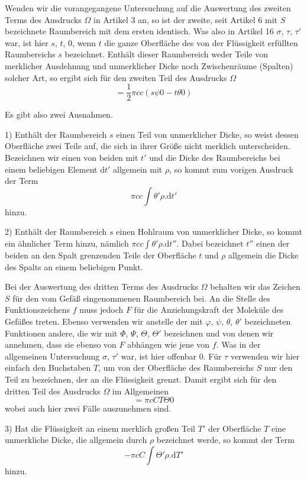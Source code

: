Wenden wir die vorangegangene Untersuchung auf die Auswertung des zweiten Terms des Ausdrucks $\Omega$ in Artikel 3 an, so ist der zweite, seit Artikel 6 mit $S$ bezeichnete Raumbereich mit dem ersten identisch. Was also in Artikel 16 $\sigma$, $\tau$, $\tau'$ war, ist hier $s$, $t$, $0$, wenn $t$ die ganze Oberfläche des von der Flüssigkeit erfüllten Raumbereichs $s$ bezeichnet. Enthält dieser Raumbereich weder Teile von merklicher Ausdehnung und unmerklicher Dicke noch Zwischenräume (Spalten) solcher Art, so ergibt sich für den zweiten Teil des Ausdrucks $\Omega$
\[
=\frac12\pi cc(s\psi0-t\theta0)
\]

Es gibt also zwei Ausnahmen.

1) Enthält der Raumbereich $s$ einen Teil von unmerklicher Dicke, so weist dessen Oberfläche zwei Teile auf, die sich in ihrer Größe nicht merklich unterscheiden. Bezeichnen wir einen von beiden mit $t'$ und die Dicke des Raumbereichs bei einem beliebigen Element $\mathrm{d}t'$ allgemein mit $\rho$, so kommt zum vorigen Ausdruck der Term
\[
\pi cc\int\theta'\rho.\mathrm{d}t'
\]
hinzu.

2) Enthält der Raumbereich $s$ einen Hohlraum von unmerklicher Dicke, so kommt ein ähnlicher Term hinzu, nämlich $\pi cc\int\theta'\rho.\mathrm{d}t''$. Dabei bezeichnet $t''$ einen der beiden an den Spalt grenzenden Teile der Oberfläche $t$ und $\rho$ allgemein die Dicke des Spalts an einem beliebigen Punkt.

Bei der Auswertung des dritten Terms des Ausdrucks $\Omega$ behalten wir das Zeichen $S$ für den vom Gefäß eingenommenen Raumbereich bei. An die Stelle des Funktionszeichens $f$ muss jedoch $F$ für die Anziehungskraft der Moleküle des Gefäßes treten. Ebenso verwenden wir anstelle der mit $\varphi$, $\psi$, $\theta$, $\theta'$ bezeichneten Funktionen andere, die wir mit $\Phi$, $\Psi$, $\Theta$, $\Theta'$ bezeichnen und von denen wir annehmen, dass sie ebenso von $F$ abhängen wie jene von $f$. Was in der allgemeinen Untersuchung $\sigma$, $\tau'$ war, ist hier offenbar $0$. Für $\tau$ verwenden wir hier einfach den Buchstaben $T$, um von der Oberfläche des Raumbereichs $S$ nur den Teil zu bezeichnen, der an die Flüssigkeit grenzt. Damit ergibt sich für den dritten Teil des Ausdrucks $\Omega$ im Allgemeinen
\[
=\pi cCT\Theta0
\]
wobei auch hier zwei Fälle auszunehmen sind.

3) Hat die Flüssigkeit an einem merklich großen Teil $T'$ der Oberfläche $T$ eine unmerkliche Dicke, die allgemein durch $\rho$ bezeichnet werde, so kommt der Term
\[
-\pi cC\int\Theta'\rho.\mathrm{d}T'
\]
hinzu.

